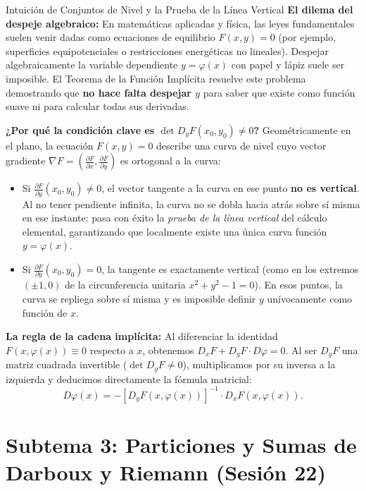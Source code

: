 \documentclass[11pt,a4paper]{article}
\begin{document}
\begin{intuitionbox}{Intuición de Conjuntos de Nivel y la Prueba de la Línea Vertical}
\textbf{El dilema del despeje algebraico:} En matemáticas aplicadas y física, las leyes fundamentales suelen venir dadas como ecuaciones de equilibrio $F(x,y) = 0$ (por ejemplo, superficies equipotenciales o restricciones energéticas no lineales). Despejar algebraicamente la variable dependiente $y = \varphi(x)$ con papel y lápiz suele ser imposible. El Teorema de la Función Implícita resuelve este problema demostrando que \textbf{no hace falta despejar $y$} para saber que existe como función suave ni para calcular todas sus derivadas.

\textbf{¿Por qué la condición clave es $\det D_y F(x_0, y_0) \neq 0$?} Geométricamente en el plano, la ecuación $F(x,y) = 0$ describe una curva de nivel cuyo vector gradiente $\nabla F = (\frac{\partial F}{\partial x}, \frac{\partial F}{\partial y})$ es ortogonal a la curva:
\begin{itemize}[noitemsep]
    \item Si $\frac{\partial F}{\partial y}(x_0, y_0) \neq 0$, el vector tangente a la curva en ese punto \textbf{no es vertical}. Al no tener pendiente infinita, la curva no se dobla hacia atrás sobre sí misma en ese instante: pasa con éxito la \textit{prueba de la línea vertical} del cálculo elemental, garantizando que localmente existe una única curva función $y = \varphi(x)$.
    \item Si $\frac{\partial F}{\partial y}(x_0, y_0) = 0$, la tangente es exactamente vertical (como en los extremos $(\pm 1, 0)$ de la circunferencia unitaria $x^2 + y^2 - 1 = 0$). En esos puntos, la curva se repliega sobre sí misma y es imposible definir $y$ unívocamente como función de $x$.
\end{itemize}

\textbf{La regla de la cadena implícita:} Al diferenciar la identidad $F(x, \varphi(x)) \equiv 0$ respecto a $x$, obtenemos $D_x F + D_y F \cdot D\varphi = 0$. Al ser $D_y F$ una matriz cuadrada invertible ($\det D_y F \neq 0$), multiplicamos por su inversa a la izquierda y deducimos directamente la fórmula matricial:
\[
D\varphi(x) = - \left[ D_y F(x, \varphi(x)) \right]^{-1} \cdot D_x F(x, \varphi(x)).
\]
\end{intuitionbox}

\section{Subtema 3: Particiones y Sumas de Darboux y Riemann (Sesión 22)}
\end{document}
